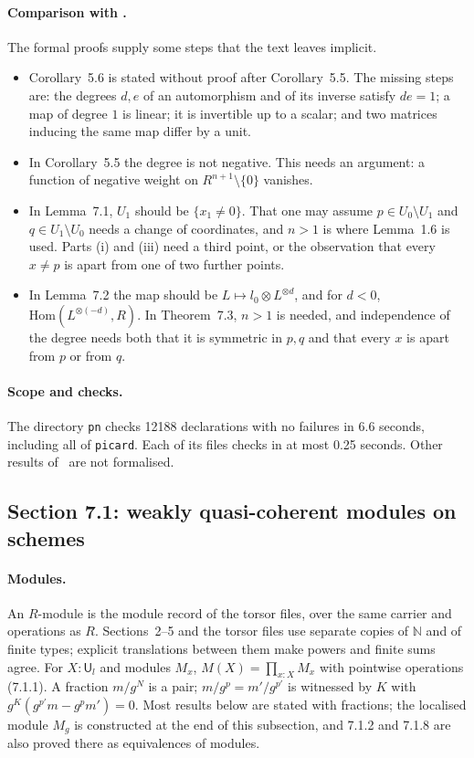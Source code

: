 \documentclass[11pt]{article}
\newcommand{\kw}[1]{\texttt{#1}}
\newcommand{\U}{\mathsf{U}}
\theoremstyle{remark}
\begin{document}
\paragraph{Comparison with \cite{Proj}.} The formal proofs supply some
steps that the text leaves implicit.
\begin{itemize}
\item Corollary~5.6 is stated without proof after Corollary~5.5. The
  missing steps are: the degrees $d,e$ of an automorphism and of its
  inverse satisfy $de=1$; a map of degree $1$ is linear; it is invertible
  up to a scalar; and two matrices inducing the same map differ by a unit.
\item In Corollary~5.5 the degree is not negative. This needs an argument:
  a function of negative weight on $R^{n+1}\setminus\{0\}$ vanishes.
\item In Lemma~7.1, $U_1$ should be $\{x_1\ne0\}$. That one may assume
  $p\in U_0\setminus U_1$ and $q\in U_1\setminus U_0$ needs a change of
  coordinates, and $n>1$ is where Lemma~1.6 is used. Parts (i) and (iii)
  need a third point, or the observation that every $x\ne p$ is apart
  from one of two further points.
\item In Lemma~7.2 the map should be $L\mapsto l_0\otimes L^{\otimes d}$,
  and for $d<0$, $\mathrm{Hom}(L^{\otimes(-d)},R)$. In Theorem~7.3, $n>1$
  is needed, and independence of the degree needs both that it is
  symmetric in $p,q$ and that every $x$ is apart from $p$ or from $q$.
\end{itemize}

\paragraph{Scope and checks.} The directory \kw{pn} checks 12188
declarations with no failures in 6.6 seconds, including all of
\kw{picard}. Each of its files checks in at most 0.25 seconds. Other
results of~\cite{Proj} are not formalised.

\subsection*{Section 7.1: weakly quasi-coherent modules on schemes}

\paragraph{Modules.} An $R$-module is the module record of the torsor
files, over the same carrier and operations as $R$. Sections~2--5 and
the torsor files use separate copies of $\mathbb N$ and of finite types;
explicit translations between them make powers and finite sums agree.
For $X:\U_l$ and modules $M_x$, $M(X)=\prod_{x:X}M_x$ with pointwise
operations (7.1.1). A fraction $m/g^N$ is a pair; $m/g^p=m'/g^{p'}$ is
witnessed by $K$ with $g^K(g^{p'}m-g^pm')=0$. Most results below are
stated with fractions; the localised module $M_g$ is constructed at the
end of this subsection, and 7.1.2 and 7.1.8 are also proved there as
equivalences of modules.
\end{document}
